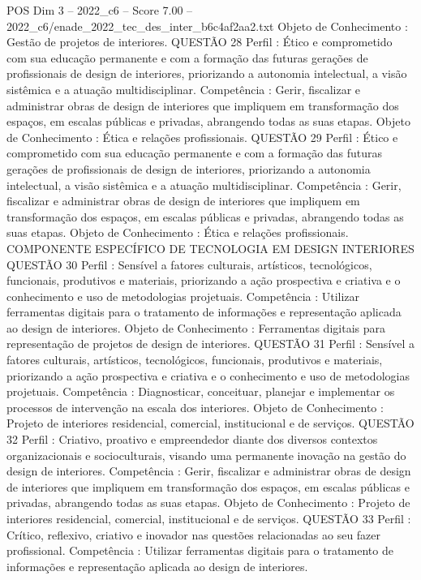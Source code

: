 \begin{textsample}{POS Dim 3 – 2022\_c6 – Score 7.00 – 2022\_c6/enade\_2022\_tec\_des\_inter\_b6c4af2aa2.txt}
Objeto de Conhecimento : Gestão de projetos de interiores.
QUESTÃO 28 Perfil : Ético e comprometido com sua educação permanente e com a formação das futuras gerações de profissionais de design de interiores, priorizando a autonomia intelectual, a visão sistêmica e a atuação multidisciplinar.
Competência : Gerir, fiscalizar e administrar obras de design de interiores que impliquem em transformação dos espaços, em escalas públicas e privadas, abrangendo todas as suas etapas.
Objeto de Conhecimento : Ética e relações profissionais.
QUESTÃO 29 Perfil : Ético e comprometido com sua educação permanente e com a formação das futuras gerações de profissionais de design de interiores, priorizando a autonomia intelectual, a visão sistêmica e a atuação multidisciplinar.
Competência : Gerir, fiscalizar e administrar obras de design de interiores que impliquem em transformação dos espaços, em escalas públicas e privadas, abrangendo todas as suas etapas.
Objeto de Conhecimento : Ética e relações profissionais.
COMPONENTE ESPECÍFICO DE TECNOLOGIA EM DESIGN INTERIORES QUESTÃO 30 Perfil : Sensível a fatores culturais, artísticos, tecnológicos, funcionais, produtivos e materiais, priorizando a ação prospectiva e criativa e o conhecimento e uso de metodologias projetuais.
Competência : Utilizar ferramentas digitais para o tratamento de informações e representação aplicada ao design de interiores.
Objeto de Conhecimento : Ferramentas digitais para representação de projetos de design de interiores.
QUESTÃO 31 Perfil : Sensível a fatores culturais, artísticos, tecnológicos, funcionais, produtivos e materiais, priorizando a ação prospectiva e criativa e o conhecimento e uso de metodologias projetuais.
Competência : Diagnosticar, conceituar, planejar e implementar os processos de intervenção na escala dos interiores.
Objeto de Conhecimento : Projeto de interiores residencial, comercial, institucional e de serviços.
QUESTÃO 32 Perfil : Criativo, proativo e empreendedor diante dos diversos contextos organizacionais e socioculturais, visando uma permanente inovação na gestão do design de interiores.
Competência : Gerir, fiscalizar e administrar obras de design de interiores que impliquem em transformação dos espaços, em escalas públicas e privadas, abrangendo todas as suas etapas.
Objeto de Conhecimento : Projeto de interiores residencial, comercial, institucional e de serviços.
QUESTÃO 33 Perfil : Crítico, reflexivo, criativo e inovador nas questões relacionadas ao seu fazer profissional.
Competência : Utilizar ferramentas digitais para o tratamento de informações e representação aplicada ao design de interiores.

\end{textsample}
